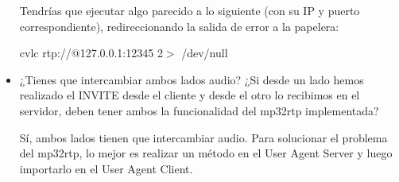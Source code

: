 \documentclass[a4paper,11pt]{article}
\begin{document}
\begin{itemize}
Tendrías que ejecutar algo parecido a lo siguiente (con su IP y puerto correspondiente), redireccionando la salida de error a la papelera:

cvlc rtp://@127.0.0.1:12345 2$>$ /dev/null

\item ¿Tienes que intercambiar ambos lados audio? ¿Si desde un lado hemos realizado el INVITE desde el cliente y desde el otro lo recibimos en el servidor, deben tener ambos la funcionalidad del mp32rtp implementada?

Sí, ambos lados tienen que intercambiar audio. Para solucionar el problema del mp32rtp, lo mejor es realizar un método en el User Agent Server y luego importarlo en el User Agent Client.

\end{itemize}

%
%
%
%
%
%
%



%
%
\end{document}
